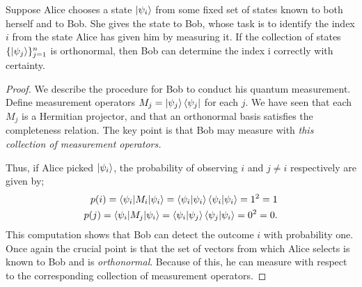 \begin{example} \label{example: orthogonal states for measurements}
Suppose Alice chooses a state $\ket{\psi_i}$ from some fixed set of states known to both herself and to Bob. She gives the state to Bob, whose task is to identify the index $i$ from the state Alice has given him by measuring it. If the collection of states $\{\ket{\psi_j}\}_{j=1}^n$ is orthonormal, then Bob can determine the index i correctly with certainty.
\end{example}
\begin{proof}
We describe the procedure for Bob to conduct his quantum measurement.  Define measurement operators $M_j=\ket{\psi_j}\bra{\psi_j}$ for each $j$.  We have seen that each $M_j$ is a Hermitian projector, and that an orthonormal basis satisfies the completeness relation.  The key point is that Bob may measure with {\emph{this collection of measurement operators.}}

Thus, if Alice picked $\ket{\psi_i}$, the probability of observing $i$ and $j\neq i$ respectively are given by;
\begin{align}
p(i)=\braket{\psi_i | M_i |\psi_i}=\braket{\psi_i |\psi_i}\braket{\psi_i |\psi_i}=1^2=1\\
p(j)=\braket{\psi_i | M_j |\psi_i}=\braket{\psi_i |\psi_j}\braket{\psi_j |\psi_i}=0^2=0.
\end{align}
This computation shows that Bob can detect the outcome $i$ with probability one.  Once again the crucial point is that the set of vectors from which Alice selects is known to Bob and is {\emph{orthonormal}}. Because of this, he can measure with respect to the corresponding collection of measurement operators. 
\end{proof}

